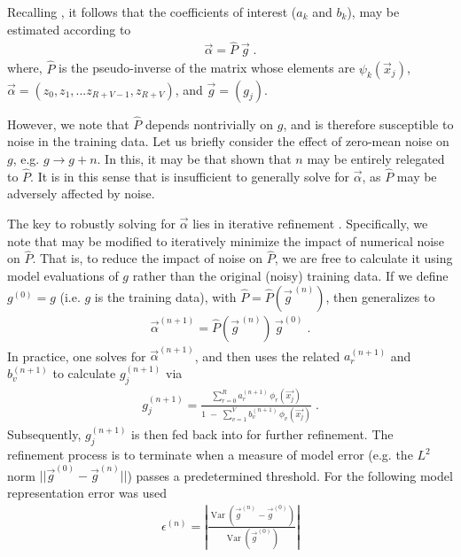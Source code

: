 \documentclass[twocolumn,aps,prd,floatfix,preprintnumbers,a4paper,nofootinbib,
superscriptaddress,10pt]{revtex4-1}
\begin{document}
%
\par Recalling , it follows that the coefficients of interest ($a_k$ and $b_k$), may be estimated according to
%
\begin{align}
  \label{eq:pinv2}
  \vec{\alpha} = \hat{P} \; \vec{g} \;.
\end{align}
%
where, $\hat{P}$ is the pseudo-inverse of the matrix whose elements are $\psi_k(\vec{x}_j)$, $\vec\alpha = ( z_0, z_1, ... z_{R+V-1},z_{R+V} )$, and $\vec{g} = ( g_j )$.
%
\par However, we note that $\hat{P}$ depends nontrivially on $g$, and is therefore susceptible to noise in the training data.
%
Let us briefly consider the effect of zero-mean noise on $g$, e.g. $g \rightarrow g+n$.
%
In this, it may be that shown that $n$ may be entirely relegated to $\hat{P}$.
%
It is in this sense that  is insufficient to generally solve for $\vec{\alpha}$, as $\hat{P}$ may be adversely affected by noise.
%
%
\par The key to robustly solving for $\vec{\alpha}$ lies in iterative refinement \cite{Press:1992:NRC:148286}.
%
Specifically, we note that  may be modified to iteratively minimize the impact of numerical noise on $\hat{P}$.
%
That is, to reduce the impact of noise on $\hat{P}$, we are free to calculate it using model evaluations of $g$ rather than the original (noisy) training data.
%
If we define $g^{(0)}=g$ (i.e. $g$ is the training data), with $\hat{P} = \hat{P}( \vec{g}^{\,(n)} )$, then  generalizes to
%
\begin{align}
  \label{eq:pinv3}
  \vec{\alpha}^{(n+1)} = \hat{P}(\vec{g}^{\,(n)}) \, \vec{g}^{(0)}\;.
\end{align}
%
In practice, one solves  for $\vec{\alpha}^{(n+1)}$, and then uses the related $a_r^{(n+1)}$ and $b_v^{(n+1)}$ to calculate $g_j^{(n+1)}$ via
%
\begin{align}
  \label{eq:rat4}
  g_j^{(n+1)} =  \frac{ \sum_{r=0}^{R} a^{(n+1)}_r \, \phi_{r}(\vec{x_j}) }{ 1\;-\;  \sum_{v=1}^{V} b^{(n+1)}_v \, \phi_{v}(\vec{x_j}) } \; .
\end{align}
%
Subsequently, $g_j^{(n+1)}$ is then fed back into  for further refinement.
%
The refinement process is to terminate when a measure of model error (e.g. the $L^2$ norm $||\vec{g}^{(0)}-\vec{g}^{(n)}||$) passes a predetermined threshold. For \cite{lionel_london_2018_1402516} the following model representation error was used
%
\begin{align}
  \label{eq:raterr}
  \epsilon^{(n)}  = \left|\frac{\operatorname{Var}\left(\vec{g}^{(n)} - \vec{g}^{(0)}\right)}{\operatorname{Var}\left(\vec{g}^{(0)}\right)}\right|
\end{align}
\end{document}
